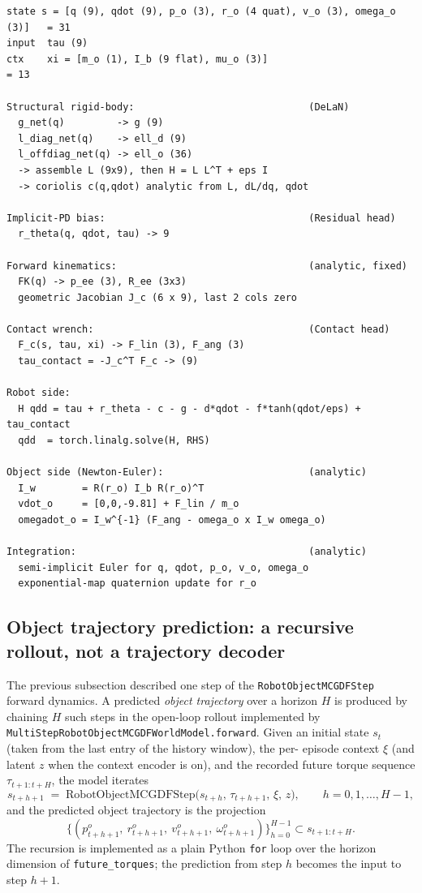 \documentclass[11pt]{article}
\begin{document}
\begin{lstlisting}
state s = [q (9), qdot (9), p_o (3), r_o (4 quat), v_o (3), omega_o (3)]   = 31
input  tau (9)
ctx    xi = [m_o (1), I_b (9 flat), mu_o (3)]                              = 13

Structural rigid-body:                              (DeLaN)
  g_net(q)         -> g (9)
  l_diag_net(q)    -> ell_d (9)
  l_offdiag_net(q) -> ell_o (36)
  -> assemble L (9x9), then H = L L^T + eps I
  -> coriolis c(q,qdot) analytic from L, dL/dq, qdot

Implicit-PD bias:                                   (Residual head)
  r_theta(q, qdot, tau) -> 9

Forward kinematics:                                 (analytic, fixed)
  FK(q) -> p_ee (3), R_ee (3x3)
  geometric Jacobian J_c (6 x 9), last 2 cols zero

Contact wrench:                                     (Contact head)
  F_c(s, tau, xi) -> F_lin (3), F_ang (3)
  tau_contact = -J_c^T F_c -> (9)

Robot side:
  H qdd = tau + r_theta - c - g - d*qdot - f*tanh(qdot/eps) + tau_contact
  qdd  = torch.linalg.solve(H, RHS)

Object side (Newton-Euler):                         (analytic)
  I_w        = R(r_o) I_b R(r_o)^T
  vdot_o     = [0,0,-9.81] + F_lin / m_o
  omegadot_o = I_w^{-1} (F_ang - omega_o x I_w omega_o)

Integration:                                        (analytic)
  semi-implicit Euler for q, qdot, p_o, v_o, omega_o
  exponential-map quaternion update for r_o
\end{lstlisting}

\subsection{Object trajectory prediction: a recursive rollout, not a trajectory decoder}
\label{sec:object-trajectory-prediction}

The previous subsection described one step of the
\texttt{RobotObjectMCGDFStep} forward dynamics.  A predicted \emph{object
trajectory} over a horizon $H$ is produced by chaining $H$ such steps in
the open-loop rollout implemented by
\texttt{MultiStepRobotObjectMCGDFWorldModel.forward}.  Given an initial
state $s_t$ (taken from the last entry of the history window), the per-
episode context $\xi$ (and latent $z$ when the context encoder is on),
and the recorded future torque sequence $\tau_{t+1:t+H}$, the model
iterates
\begin{equation}
  s_{t+h+1} \;=\; \mathrm{RobotObjectMCGDFStep}\bigl(s_{t+h},\,\tau_{t+h+1},\,\xi,\,z\bigr),
  \qquad h = 0, 1, \dots, H-1,
  \label{eq:trajectory-recursion}
\end{equation}
and the predicted object trajectory is the projection
\begin{equation}
  \bigl\{(p^o_{t+h+1},\ r^o_{t+h+1},\ v^o_{t+h+1},\ \omega^o_{t+h+1})\bigr\}_{h=0}^{H-1}
  \subset s_{t+1:t+H}.
\end{equation}
The recursion is implemented as a plain Python \texttt{for} loop over the
horizon dimension of \texttt{future\_torques}; the prediction from step
$h$ becomes the input to step $h+1$.
\end{document}
